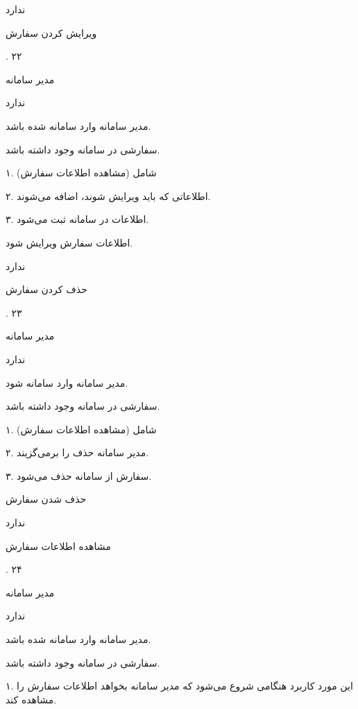 ندارد 


\newpage

ویرایش کردن سفارش

.
۲۲

مدیر سامانه

ندارد


مدیر سامانه وارد سامانه شده باشد.

سفارشی در سامانه وجود داشته باشد.


۱. شامل (مشاهده اطلاعات سفارش)

۲. اطلاعاتی که باید ویرایش شوند، اضافه می‌شوند.

۳. اطلاعات در سامانه ثبت می‌شود.

اطلاعات سفارش ویرایش شود.

ندارد

\newpage

حذف کردن سفارش

.
۲۳

مدیر سامانه

ندارد

مدیر سامانه وارد سامانه شود.

سفارشی در سامانه وجود داشته باشد.


۱. شامل (مشاهده اطلاعات سفارش)

۲. مدیر سامانه حذف را برمی‌گزیند.

۳. سفارش از سامانه حذف می‌شود.

حذف شدن سفارش

ندارد

\newpage

مشاهده اطلاعات سفارش

.
۲۴

مدیر سامانه

ندارد


مدیر سامانه وارد سامانه شده باشد.

سفارشی در سامانه وجود داشته باشد.


۱. این مورد کاربرد هنگامی شروع می‌شود که مدیر سامانه بخواهد اطلاعات سفارش را مشاهده کند.

